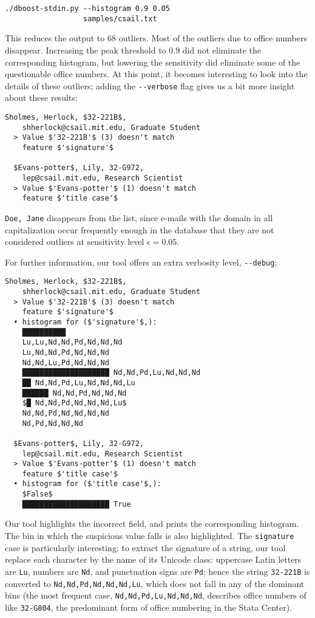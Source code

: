 \begin{lstlisting}[gobble=2]
./dboost-stdin.py --histogram 0.9 0.05 
                  samples/csail.txt
\end{lstlisting}

This reduces the output to $68$ outliers. Most of the outliers due to office numbers disappear. Increasing the peak threshold to $0.9$ did not eliminate the corresponding histogram, but lowering the sensitivity did eliminate some of the questionable office numbers. At this point, it becomes interesting to look into the details of these outliers; adding the \lstinline{--verbose} flag gives us a bit more insight about these results:

\begin{lstlisting}[gobble=2]
  Sholmes, Herlock, $32-221B$, 
    shherlock@csail.mit.edu, Graduate Student
  > Value $'32-221B'$ (3) doesn't match 
    feature $'signature'$
 
  $Evans-potter$, Lily, 32-G972, 
    lep@csail.mit.edu, Research Scientist
  > Value $'Evans-potter'$ (1) doesn't match 
    feature $'title case'$  
\end{lstlisting}

\lstinline{Doe, Jane} disappears from the list, since e-mails with the domain in all capitalization occur frequently enough in the database that they are not considered outliers at sensitivity level $\epsilon = 0.05$.
 
For further information, our tool offers an extra verbosity level, \lstinline{--debug};

\begin{lstlisting}[gobble=2]
  Sholmes, Herlock, $32-221B$, 
    shherlock@csail.mit.edu, Graduate Student
  > Value $'32-221B'$ (3) doesn't match 
    feature $'signature'$
  • histogram for ($'signature'$,):
    ██████████ 
    Lu,Lu,Nd,Nd,Pd,Nd,Nd,Nd
    Lu,Nd,Nd,Pd,Nd,Nd,Nd
    Nd,Nd,Lu,Pd,Nd,Nd,Nd
    ████████████████████ Nd,Nd,Pd,Lu,Nd,Nd,Nd
    ██ Nd,Nd,Pd,Lu,Nd,Nd,Nd,Lu
    ██████ Nd,Nd,Pd,Nd,Nd,Nd
    $█ Nd,Nd,Pd,Nd,Nd,Nd,Lu$
    Nd,Nd,Pd,Nd,Nd,Nd,Nd
    Nd,Pd,Nd,Nd,Nd

  $Evans-potter$, Lily, 32-G972, 
    lep@csail.mit.edu, Research Scientist
  > Value $'Evans-potter'$ (1) doesn't match 
    feature $'title case'$  
  • histogram for ($'title case'$,):
    $False$
    ████████████████████ True
\end{lstlisting}

Our tool highlights the incorrect field, and prints the corresponding histogram. The bin in which the suspicious value falls is also highlighted. The \lstinline{signature} case is particularly interesting: to extract the signature of a string, our tool replace each character by the name of its Unicode class: uppercase Latin letters are \lstinline{Lu}, numbers are \lstinline{Nd}, and punctuation signs are \lstinline{Pd}; hence the string \lstinline{32-221B} is converted to \lstinline{Nd,Nd,Pd,Nd,Nd,Nd,Lu}, which does not fall in any of the dominant bins (the most frequent case, \lstinline{Nd,Nd,Pd,Lu,Nd,Nd,Nd}, describes office numbers of like \lstinline{32-G804}, the predominant form of office numbering in the Stata Center).

